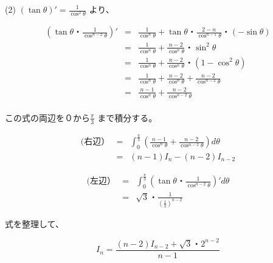 \documentclass[./main]{subfiles}
\begin{document}
(2)
$ ( \tan \theta)' = \frac{1}{\cos^2 \theta} $ より、

\begin{eqnarray}
 ( \tan \theta ・ \frac{1}{\cos^{n-2} \theta}) '
& = & \frac{1}{\cos^n \theta} +  \tan \theta ・  \frac{2-n}{\cos^{n-1} \theta} ・ ( - \sin \theta) \\
& = & \frac{1}{\cos^n \theta} +  \frac{n-2}{\cos^{n} \theta} ・ \sin^2 \theta \\
& = & \frac{1}{\cos^n \theta} +  \frac{n-2}{\cos^{n} \theta} ・ (1 -  \cos^2 \theta ) \\
& = & \frac{1}{\cos^n \theta} +  \frac{n-2}{\cos^{n} \theta} + \frac{n-2}{\cos^{n-2} \theta} \\
& = & \frac{n-1}{\cos^{n} \theta} + \frac{n-2}{\cos^{n-2} \theta} \\
\end{eqnarray}

この式の両辺を０から$\frac{\pi}{3}$ まで積分する。

\begin{eqnarray}
(右辺） 
& = &  \int_{0}^{\frac{\pi}{3}} (\frac{n-1}{\cos^{n} \theta} + \frac{n-2}{\cos^{n-2} \theta} ) d\theta \\
& = & (n-1)I_{n} - (n-2) I_{n-2}
\end{eqnarray}

\begin{eqnarray}
(左辺） 
& = &  \int_{0}^{\frac{\pi}{3}} ( \tan \theta ・ \frac{1}{\cos^{n-2} \theta}) 'd\theta \\
& = &　\sqrt{3}・\frac{1}{(\frac{1}{2})^{n-2}}
\end{eqnarray}

式を整理して、

\begin{equation}
I_{n}=\frac{(n-2)I_{n-2}+\sqrt{3}・2^{n-2}}{n-1}
\end{equation}
\end{document}
